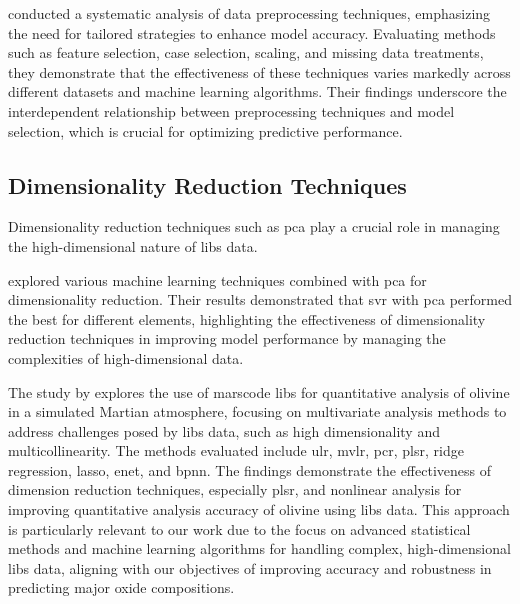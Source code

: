 \citet{Huang2015AnEA} conducted a systematic analysis of data preprocessing techniques, emphasizing the need for tailored strategies to enhance model accuracy.
Evaluating methods such as feature selection, case selection, scaling, and missing data treatments, they demonstrate that the effectiveness of these techniques varies markedly across different datasets and machine learning algorithms.
Their findings underscore the interdependent relationship between preprocessing techniques and model selection, which is crucial for optimizing predictive performance.

\subsection{Dimensionality Reduction Techniques}
Dimensionality reduction techniques such as \gls{pca} play a crucial role in managing the high-dimensional nature of \gls{libs} data.

\citet{rezaei_dimensionality_reduction} explored various machine learning techniques combined with \gls{pca} for dimensionality reduction. Their results demonstrated that \gls{svr} with \gls{pca} performed the best for different elements, highlighting the effectiveness of dimensionality reduction techniques in improving model performance by managing the complexities of high-dimensional data.

The study by \citet{liuComparisonQuantitativeAnalysis2022} explores the use of \gls{marscode} \gls{libs} for quantitative analysis of olivine in a simulated Martian atmosphere, focusing on multivariate analysis methods to address challenges posed by \gls{libs} data, such as high dimensionality and multicollinearity.
The methods evaluated include \gls{ulr}, \gls{mvlr}, \gls{pcr}, \gls{plsr}, ridge regression, \gls{lasso}, \gls{enet}, and \gls{bpnn}.
The findings demonstrate the effectiveness of dimension reduction techniques, especially \gls{plsr}, and nonlinear analysis for improving quantitative analysis accuracy of olivine using \gls{libs} data.
This approach is particularly relevant to our work due to the focus on advanced statistical methods and machine learning algorithms for handling complex, high-dimensional \gls{libs} data, aligning with our objectives of improving accuracy and robustness in predicting major oxide compositions.